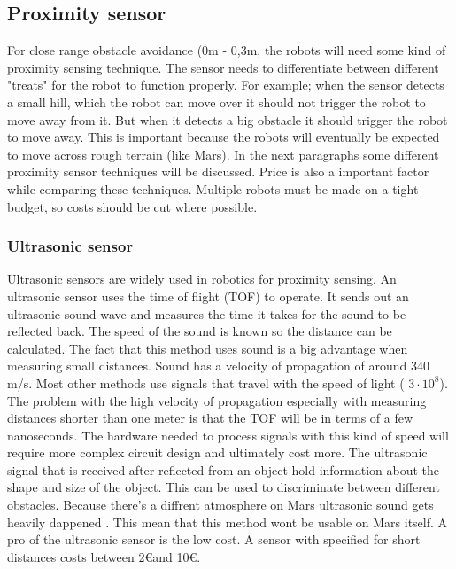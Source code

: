 \documentclass[10pt,a4paper]{article}
\begin{document}
\newpage

\subsection{Proximity sensor}

For close range obstacle avoidance (0m - 0,3m, the robots will need some kind of proximity sensing technique. The sensor needs to differentiate between different "treats" for the robot to function properly. For example; when the sensor detects a small hill, which the robot can move over it should not trigger the robot to move away from it. But when it detects a big obstacle it should trigger the robot to move away. This is important because the robots will eventually be expected to move across rough terrain (like Mars). In the next paragraphs some different proximity sensor techniques will be discussed. Price is also a important factor while comparing these techniques. Multiple robots must be made on a tight budget, so costs should be cut where possible.\\

\subsubsection{Ultrasonic sensor}
Ultrasonic sensors are widely used in robotics for proximity sensing. An ultrasonic sensor uses the time of flight (TOF) to operate. It sends out an ultrasonic sound wave and measures the time it takes for the sound to be reflected back. The speed of the sound is known so the distance can be calculated. The fact that this method uses sound is a big advantage when measuring small distances. Sound has a velocity of propagation of around 340 m/s. Most other methods use signals that travel with the speed of light ( $3\cdot10^{8}$). The problem with the high velocity of  propagation especially with measuring distances shorter than one meter is that the TOF will be in terms of a few nanoseconds.  The hardware needed to process signals with this kind of speed will require more complex circuit design and ultimately cost more. The ultrasonic signal that is received after reflected from an object hold information about the shape and size of the object. This can be used to discriminate between different obstacles\cite{ultraobject}. Because there's a diffrent atmosphere on Mars ultrasonic sound gets heavily dappened \cite{soundonmars}. This mean that this method wont be usable on Mars itself. A pro of the ultrasonic sensor is the low cost. A sensor with specified for short distances costs between 2\euro and 10\euro.
\end{document}
